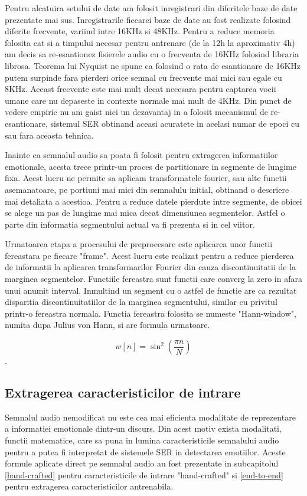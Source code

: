 \documentclass[a4paper,12pt]{book}
\begin{document}
					Pentru alcatuira setului de date am folosit inregistrari din diferitele baze de date prezentate mai sus. Inregistrarile fiecarei baze de date au fost realizate folosind diferite frecvente, variind intre 16KHz si 48KHz. Pentru a reduce memoria folosita cat si a  timpului necesar pentru antrenare (de la 12h la aproximativ 4h) am decis sa re-esantionez fisierele audio cu o frecventa de 16KHz folosind libraria librosa. Teorema lui Nyquist ne spune ca folosind o rata de esantionare de 16KHz putem surpinde fara pierderi orice semnal cu frecvente mai mici sau egale cu 8KHz. Aceast frecvente este mai mult decat necesara pentru captarea vocii umane care nu depaseste in contexte normale mai mult de 4KHz. Din punct de vedere empiric nu am gaist nici un dezavantaj in a folosit mecanismul de re-esantionare, sistemul SER obtinand aceasi acuratete in acelasi numar de epoci cu sau fara aceasta tehnica. \par
					
					Inainte ca semnalul audio sa poata fi folosit pentru extragerea informatiilor emotionale, acesta trece printr-un proces de partitionare in segmente de lungime fixa. Acest lucru ne permite sa aplicam transformatele fourier, sau alte functii asemanatoare, pe portiuni mai mici din semnalulu initial, obtinand o descriere mai detaliata a acestioa. Pentru a reduce datele pierdute intre segmente, de obicei se alege un pas de lungime mai mica decat dimensiunea segmentelor. Astfel o parte din informatia segmentului actual va fi prezenta si in cel viitor. \par 
					Urmatoarea etapa a procesului de preprocesare este aplicarea unor functii fereastara pe fiecare "frame". Acest lucru este realizat pentru a reduce pierderea de informatii la aplicarea transformarilor Fourier din cauza discontinuitatii de la marginea segmentelor. Functiile fereastra sunt functii care converg la zero in afara unui anumit interval. Inmultind un segment cu o astfel de functie are ca rezultat disparitia discontinuitatiilor de la marginea segmentului, similar cu privitul printr-o fereastra normala. Functia fereastra folosita se numeste "Hann-window", numita dupa Julius von Hann, si are formula urmatoare. \par
					\begin{equation}
					w[n]=\sin^2(\frac{\pi n}{N})
					\end{equation}.
					
				\subsection{Extragerea caracteristicilor de intrare} \label{fex}
				Semnalul audio nemodificat nu este cea mai eficienta modalitate de reprezentare a informatiei emotionale dintr-un discurs. Din acest motiv exista modalitati, functii matematice, care sa puna in lumina caracteristicile semnalului audio pentru a putea fi interpretat de sistemele SER in detectarea emotiilor. Aceste formule aplicate direct pe semnalul audio au fost prezentate in subcapitolul \ref{hand-crafted} pentru caracteristicile de intrare "hand-crafted" si \ref{end-to-end} pentru extragerea caracteristicilor antrenabila. \par
				
\end{document}
